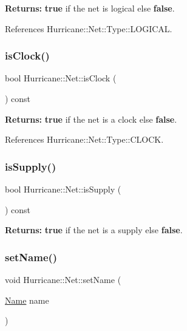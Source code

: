 {\bfseries Returns\+:} {\bfseries true} if the net is logical else {\bfseries false}. 

References Hurricane\+::\+Net\+::\+Type\+::\+L\+O\+G\+I\+C\+AL.

\mbox{\label{classHurricane_1_1Net_a8807cc000bbbe1c340c71fcbfbb8fe33}} 
\subsubsection{\texorpdfstring{is\+Clock()}{isClock()}}
{\footnotesize\ttfamily bool Hurricane\+::\+Net\+::is\+Clock (\begin{DoxyParamCaption}{ }\end{DoxyParamCaption}) const\hspace{0.3cm}{\ttfamily [inline]}}

{\bfseries Returns\+:} {\bfseries true} if the net is a clock else {\bfseries false}. 

References Hurricane\+::\+Net\+::\+Type\+::\+C\+L\+O\+CK.

\mbox{\label{classHurricane_1_1Net_ab8947fc6c5093341958b94148407c2a2}} 
\subsubsection{\texorpdfstring{is\+Supply()}{isSupply()}}
{\footnotesize\ttfamily bool Hurricane\+::\+Net\+::is\+Supply (\begin{DoxyParamCaption}{ }\end{DoxyParamCaption}) const\hspace{0.3cm}{\ttfamily [inline]}}

{\bfseries Returns\+:} {\bfseries true} if the net is a supply else {\bfseries false}. \mbox{\label{classHurricane_1_1Net_a1a39702b9f4d26ba29ad0dafcdddf840}} 
\subsubsection{\texorpdfstring{set\+Name()}{setName()}}
{\footnotesize\ttfamily void Hurricane\+::\+Net\+::set\+Name (\begin{DoxyParamCaption}\item[{\mbox{\hyperlink{classHurricane_1_1Name}{Name}}}]{name }\end{DoxyParamCaption})}

